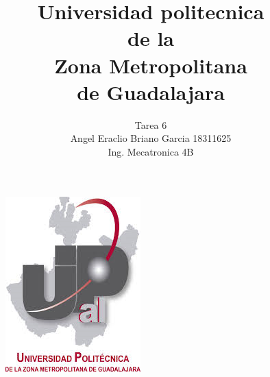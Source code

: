 \documentclass[12pt,a4paper]{article}
\begin{document}
\title{Universidad politecnica\\ de la \\ Zona Metropolitana\\ de Guadalajara}
\author{Tarea 6\\ Angel Eraclio Briano Garcia 18311625\\ Ing. Mecatronica 4B}
\maketitle
\begin{figure}[h!]
\centering
\includegraphics[scale=1]{untitled.png} 
\end{figure}
\newpage
 
\end{document}
